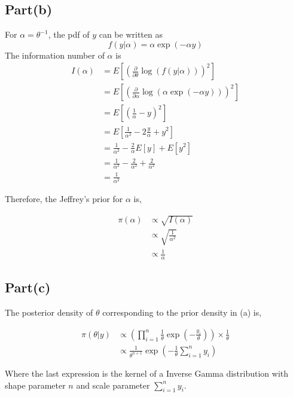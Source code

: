\documentclass[a4paper]{article}
\begin{document}
\subsection*{Part(b)}
For \(\alpha = \theta^{-1}\), the pdf of \(y\) can be written as 
\[
    f(y|\alpha) = \alpha \exp(-\alpha y)
\]
The information number of \(\alpha\) is 
\begin{align*}
    I(\alpha) &= E \left[\left(\frac{\partial}{\partial \theta } \log(f(y|\alpha))\right)^2\right]\\
    &= E \left[\left(\frac{\partial}{\partial \alpha } \log\left(\alpha\exp\left(-\alpha y\right)\right)\right)^2\right]\\
    &= E \left[\left(\frac{1}{\alpha} -y \right)^2\right]\\
    &= E \left[\frac{1}{\alpha^2} -2 \frac{y}{\alpha} + y^2\right]\\
    &= \frac{1}{\alpha^2} - \frac{2}{\alpha} E[y] + E[y^2]\\
    &= \frac{1}{\alpha^2} - \frac{2}{\alpha^2} + \frac{2}{\alpha^2}\\
    &= \frac{1}{\alpha^2}
\end{align*}

Therefore, the Jeffrey's prior for \(\alpha\) is,

\begin{align*}
    \pi(\alpha) &\varpropto \sqrt{I(\alpha)}\\
    &\varpropto \sqrt{\frac{1}{\alpha^2}}\\
    &\varpropto \frac{1}{\alpha}
\end{align*}

\subsection*{Part(c)}

The posterior density of \(\theta\) corresponding to the prior density in (a) is,

\begin{align*}
    \pi(\theta|y) &\varpropto \left(\prod_{i=1}^{n}\frac{1}{\theta}\exp\left(-\frac{y_i}{\theta}\right)\right) \times \frac{1}{\theta}\\
    &\varpropto \frac{1}{\theta^{n+1}}\exp\left(-\frac{1}{\theta}\sum_{i=1}^{n}y_i\right)
\end{align*}

Where the last expression is the kernel of a Inverse Gamma distribution with shape parameter \(n\) and scale parameter \(\sum_{i=1}^{n}y_i\).
\end{document}

